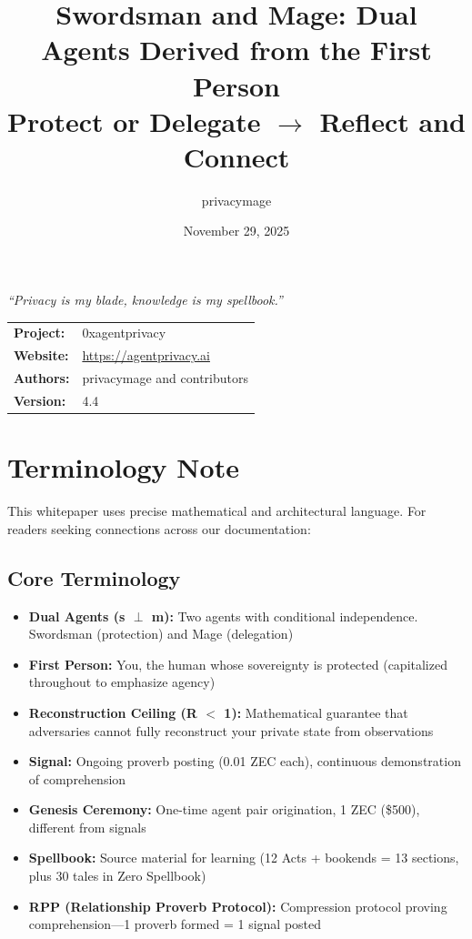 \documentclass[11pt,a4paper]{article}
\title{\textbf{Swordsman and Mage: Dual Agents Derived from the First Person}\\
\large Protect or Delegate $\rightarrow$ Reflect and Connect}
\author{privacymage}
\date{November 29, 2025}
\theoremstyle{definition}
\begin{document}
\maketitle

\begin{center}
\large\textit{``Privacy is my blade, knowledge is my spellbook.''}
\end{center}

\vspace{1em}

\begin{center}
\begin{tabular}{ll}
\textbf{Project:} & 0xagentprivacy \\
\textbf{Website:} & \url{https://agentprivacy.ai} \\
\textbf{Authors:} & privacymage and contributors \\
\textbf{Version:} & 4.4 \\
\end{tabular}
\end{center}

\newpage

\section*{Terminology Note}

This whitepaper uses precise mathematical and architectural language. For readers seeking connections across our documentation:

\subsection*{Core Terminology}

\begin{itemize}
    \item \textbf{Dual Agents (s $\perp$ m):} Two agents with conditional independence. Swordsman (protection) and Mage (delegation)
    
    \item \textbf{First Person:} You, the human whose sovereignty is protected (capitalized throughout to emphasize agency)
    
    \item \textbf{Reconstruction Ceiling (R $<$ 1):} Mathematical guarantee that adversaries cannot fully reconstruct your private state from observations
    
    \item \textbf{Signal:} Ongoing proverb posting (0.01 ZEC each), continuous demonstration of comprehension
    
    \item \textbf{Genesis Ceremony:} One-time agent pair origination, 1 ZEC (\$500), different from signals
    
    \item \textbf{Spellbook:} Source material for learning (12 Acts + bookends = 13 sections, plus 30 tales in Zero Spellbook)
    
    \item \textbf{RPP (Relationship Proverb Protocol):} Compression protocol proving comprehension---1 proverb formed = 1 signal posted
\end{itemize}
\end{document}
